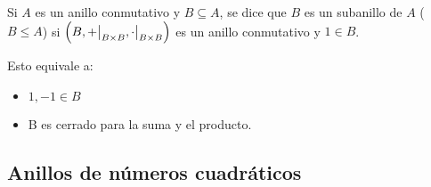 \begin{ndef}[Subanillo]

Si $A$ es un anillo conmutativo y $B \subseteq A$, se dice que $B$ es un subanillo de $A$ ($B \leq A$) si $\left(B, \restr{+}{B\times B}, \restr{\cdot}{B\times B}\right)$ es un anillo conmutativo y $1\in B$.

Esto equivale a:
\begin{itemize}
\item $1,-1 \in B$
\item B es cerrado para la suma y el producto.
\end{itemize}

\end{ndef}

\newpage

\subsection*{Anillos de números cuadráticos}

